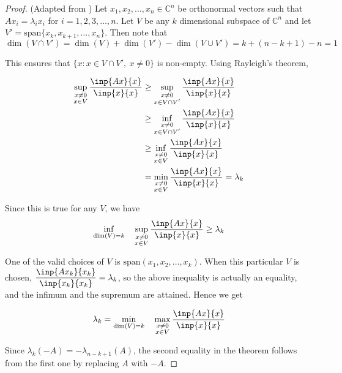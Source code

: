 \documentclass[twoside]{article}
\theoremstyle{plain}
\theoremstyle{definition}
\theoremstyle{remark}
\begin{document}
\begin{proof} (Adapted from \cite{horn_johnson})
Let \(x_1, x_2, \ldots , x_n \in \mathbb{C}^n\) be orthonormal vectors such that \(Ax_i = \lambda_i x_i\) for \(i = 1, 2, 3, \ldots , n\).  Let \(V\)  be any \(k\) dimensional subspace of \(\mathbb{C}^n\) and let \(V' = \mathrm{span}\{ x_k, x_{k + 1} , \ldots , x_n\}\). Then note that 
\[\dim(V \cap V') = \dim(V) + \dim(V') - \dim(V \cup V')  = k + (n - k + 1)  - n =  1\]

This ensures that \(\{x : x \in V \cap V', \ x \ne 0\}\) is non-empty. Using Rayleigh's theorem,

\begin{equation*} \begin{split}
\sup_{\substack{x \neq 0 \\ x \in V}} \frac{\inp{Ax}{x}}{\inp{x}{x}} & \ge \sup_{\substack{x \neq 0 \\ x \in V \cap V'}} \frac{\inp{A x}{x}}{\inp{x}{x}} \\
 & \ge \inf_{\substack{x \neq 0 \\ x \in V \cap V'}} \frac{\inp{A x}{x}}{\inp{x}{x}} \\
 & \ge \inf_{\substack{x \neq 0 \\ x \in V }} \frac{\inp{A x}{x}}{\inp{x}{x}} \\
 & = \min_{\substack{x \neq 0 \\ x \in V }} \frac{\inp{A x}{x}}{\inp{x}{x}}   = \lambda_k 
\end{split} \end{equation*}

Since this is true for any \(V\), we have 
\[ \inf_{\dim(V) =k} \quad \sup_{\substack{x \neq 0 \\ x \in V }} \frac{\inp{A x}{x}}{\inp{x}{x}}  \ge \lambda_k \]

One of the valid choices of \(V\) is \(\mathrm{span}(x_1, x_2, \ldots , x_k)\). When this particular \(V\) is chosen, \(\displaystyle \frac{\inp{Ax_k}{x_k}}{\inp{x_k}{x_k}} = \lambda_k\), so the above inequality is actually an equality, and the infimum and the supremum are attained. Hence we get 

\[ \lambda_k = \min_{\dim(V) = k}  \quad \max_{\substack{x \ne 0 \\ x \in V}} \frac{\inp{Ax}{x}}{\inp{x}{x}} \]

Since \(\lambda_k ( - A) = - \lambda_{n - k + 1} (A)\), the second equality in the theorem follows from the first one by replacing \(A\) with \(-A\).
\end{proof}
\end{document}
